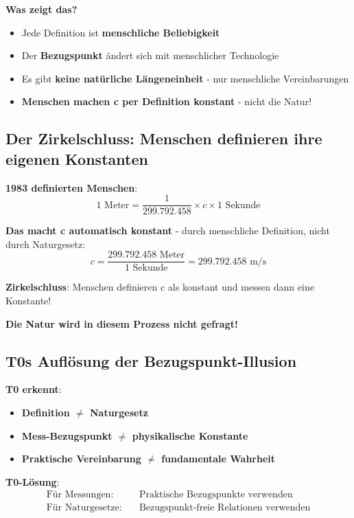 \documentclass[12pt,a4paper]{article}
\begin{document}
	\textbf{Was zeigt das?}
	\begin{itemize}
		\item Jede Definition ist \textbf{menschliche Beliebigkeit}
		\item Der \textbf{Bezugspunkt} ändert sich mit menschlicher Technologie
		\item Es gibt \textbf{keine natürliche Längeneinheit} - nur menschliche Vereinbarungen
		\item \textbf{Menschen machen c per Definition konstant} - nicht die Natur!
	\end{itemize}
	
	\subsection{Der Zirkelschluss: Menschen definieren ihre eigenen Konstanten}
	
	\textbf{1983 definierten Menschen}:
	\begin{equation}
		1 \text{ Meter} = \frac{1}{299.792.458} \times c \times 1 \text{ Sekunde}
	\end{equation}
	
	\textbf{Das macht c automatisch konstant} - durch menschliche Definition, nicht durch Naturgesetz:
	\begin{equation}
		c = \frac{299.792.458 \text{ Meter}}{1 \text{ Sekunde}} = 299.792.458 \text{ m/s}
	\end{equation}
	
	\textbf{Zirkelschluss}: Menschen definieren c als konstant und messen dann eine Konstante!
	
	\textbf{Die Natur wird in diesem Prozess nicht gefragt!}
	
	\subsection{T0s Auflösung der Bezugspunkt-Illusion}
	
	\textbf{T0 erkennt}:
	\begin{itemize}
		\item \textbf{Definition $\neq$ Naturgesetz}
		\item \textbf{Mess-Bezugspunkt $\neq$ physikalische Konstante}
		\item \textbf{Praktische Vereinbarung $\neq$ fundamentale Wahrheit}
	\end{itemize}
	
	\textbf{T0-Lösung}:
	\begin{align}
		\text{Für Messungen:} \quad &\text{Praktische Bezugspunkte verwenden} \\
		\text{Für Naturgesetze:} \quad &\text{Bezugspunkt-freie Relationen verwenden}
	\end{align}
	
\end{document}
